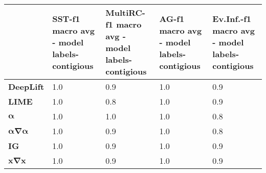 \begin{tabular}{lllll}
\toprule
{} & SST-f1 macro avg - model labels-contigious & MultiRC-f1 macro avg - model labels-contigious & AG-f1 macro avg - model labels-contigious & Ev.Inf.-f1 macro avg - model labels-contigious \\
\midrule
\textbf{DeepLift}                         &                                        1.0 &                                            0.9 &                                       1.0 &                                            0.9 \\
\textbf{LIME}                             &                                        1.0 &                                            0.8 &                                       1.0 &                                            0.9 \\
$\boldsymbol{\alpha}$                     &                                        1.0 &                                            1.0 &                                       1.0 &                                            0.8 \\
$\boldsymbol{\alpha\nabla\alpha}$         &                                        1.0 &                                            0.9 &                                       1.0 &                                            0.8 \\
\textbf{IG}                               &                                        1.0 &                                            0.9 &                                       1.0 &                                            0.9 \\
$\boldsymbol{\mathbf{x}\nabla\mathbf{x}}$ &                                        1.0 &                                            0.9 &                                       1.0 &                                            0.9 \\
\bottomrule
\end{tabular}
